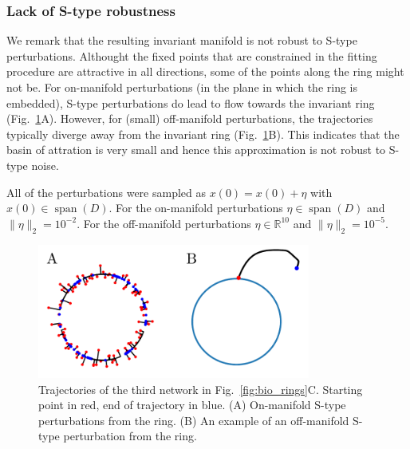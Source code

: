 \documentclass{article} %
\newcounter{ct}
\newcommand{\reals}{\mathbb{R}}
\theoremstyle{definition}
\theoremstyle{remark}
\begin{document}
\subsubsection{Lack of S-type robustness}\label{sec:empjnonrobust}
We remark that the resulting invariant manifold is not robust to S-type perturbations.
Althought the fixed points that are constrained in the fitting procedure are attractive in all directions, some of the points along the ring might not be.
For on-manifold perturbations (in the plane in which the ring is embedded), S-type perturbations do lead to flow towards the invariant ring (Fig.~\ref{fig:empj_onoff_perturbation}A).
However, for (small) off-manifold perturbations, the trajectories typically diverge away from the invariant ring (Fig.~\ref{fig:empj_onoff_perturbation}B).
This indicates that the basin of attration is very small and hence this approximation is not robust to S-type noise.


All of the perturbations were sampled as
\(x(0) = x(0) + \eta\) with \(x(0)\in \operatorname{span}(D)\).
For the on-manifold perturbations \(\eta\in \operatorname{span}(D)\)  and \(\|\eta\|_2=10^{-2}\).
For the off-manifold perturbations \(\eta\in \reals^{10}\) and \(\|\eta\|_2=10^{-5}\).


\begin{figure}[h]
\centering
\includegraphics[width=0.8\textwidth]{empj_onoff_perturbation}
\caption{Trajectories of the third network in Fig.~\ref{fig:bio_rings}C. Starting point in red, end of trajectory in blue.
(A) On-manifold S-type perturbations from the ring.
(B) An example of an off-manifold  S-type perturbation from the ring.
}\label{fig:empj_onoff_perturbation}
\end{figure}







%
%
%
%
\end{document}
